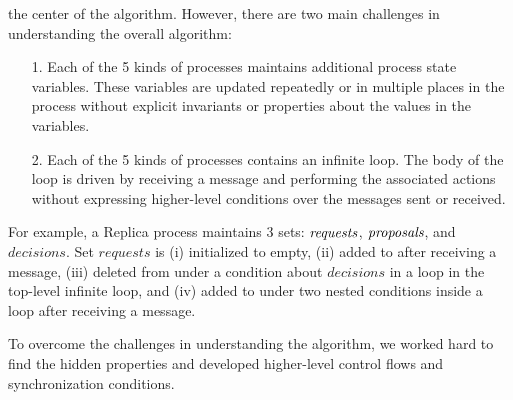 \documentclass[11pt]{article}
\newcommand\m[1]{\mbox{$#1$}} %
\begin{document}
the center of the algorithm.
However, there are two main challenges in understanding the overall algorithm:
\begin{enumerate}
  \setlength{\itemsep}{0ex}

\item[1.] Each of the 5 kinds of processes maintains additional process state
  variables.  These variables are updated repeatedly or in multiple places
  in the process without explicit invariants or properties about the values
  in the variables.

\item[2.] Each of the 5 kinds of processes contains an infinite loop.  The body
  of the loop is driven by receiving a message and performing the
  associated actions without expressing higher-level conditions over the
  messages sent or received.

\end{enumerate}
For example, a Replica process maintains 3 sets: \m{\it requests}, \m{\it
  proposals}, and \m{decisions}.  Set \m{requests} is (i) initialized to
empty, (ii) added to after receiving a  message, (iii) deleted
from under a condition about \m{decisions} in a  loop in the
top-level infinite loop, and (iv) added to under two nested conditions
inside a  loop after receiving a  message.



To overcome the challenges in understanding the algorithm, we worked
hard %
to find the hidden properties and developed higher-level control flows and
synchronization conditions.
\end{document}
